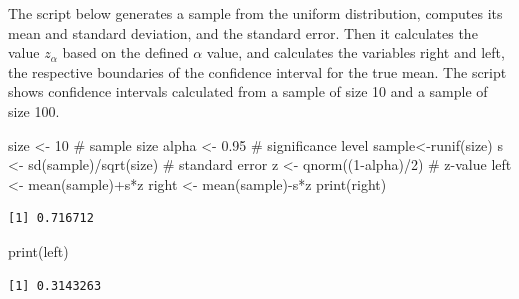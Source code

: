 \documentclass[
  letterpaper,
  DIV=11,
  numbers=noendperiod]{scrreprt}
\newenvironment{Shaded}{\begin{snugshade}}{\end{snugshade}}
\newcommand{\CommentTok}[1]{\textcolor[rgb]{0.37,0.37,0.37}{#1}}
\newcommand{\DecValTok}[1]{\textcolor[rgb]{0.68,0.00,0.00}{#1}}
\newcommand{\FloatTok}[1]{\textcolor[rgb]{0.68,0.00,0.00}{#1}}
\newcommand{\FunctionTok}[1]{\textcolor[rgb]{0.28,0.35,0.67}{#1}}
\newcommand{\NormalTok}[1]{\textcolor[rgb]{0.00,0.23,0.31}{#1}}
\newcommand{\OtherTok}[1]{\textcolor[rgb]{0.00,0.23,0.31}{#1}}
\newcommand{\SpecialCharTok}[1]{\textcolor[rgb]{0.37,0.37,0.37}{#1}}
\begin{document}
The script below generates a sample from the uniform distribution,
computes its mean and standard deviation, and the standard error. Then
it calculates the value \(z_\alpha\) based on the defined \(\alpha\)
value, and calculates the variables right and left, the respective
boundaries of the confidence interval for the true mean. The script
shows confidence intervals calculated from a sample of size 10 and a
sample of size 100.

\begin{Shaded}
\begin{Highlighting}[]
\NormalTok{size }\OtherTok{\textless{}{-}} \DecValTok{10} \CommentTok{\# sample size}
\NormalTok{alpha }\OtherTok{\textless{}{-}} \FloatTok{0.95} \CommentTok{\# significance level}
\NormalTok{sample}\OtherTok{\textless{}{-}}\FunctionTok{runif}\NormalTok{(size)}
\NormalTok{s }\OtherTok{\textless{}{-}} \FunctionTok{sd}\NormalTok{(sample)}\SpecialCharTok{/}\FunctionTok{sqrt}\NormalTok{(size) }\CommentTok{\# standard error}
\NormalTok{z }\OtherTok{\textless{}{-}} \FunctionTok{qnorm}\NormalTok{((}\DecValTok{1}\SpecialCharTok{{-}}\NormalTok{alpha)}\SpecialCharTok{/}\DecValTok{2}\NormalTok{) }\CommentTok{\# z{-}value}
\NormalTok{left }\OtherTok{\textless{}{-}} \FunctionTok{mean}\NormalTok{(sample)}\SpecialCharTok{+}\NormalTok{s}\SpecialCharTok{*}\NormalTok{z}
\NormalTok{right }\OtherTok{\textless{}{-}} \FunctionTok{mean}\NormalTok{(sample)}\SpecialCharTok{{-}}\NormalTok{s}\SpecialCharTok{*}\NormalTok{z}
\FunctionTok{print}\NormalTok{(right)}
\end{Highlighting}
\end{Shaded}

\begin{verbatim}
[1] 0.716712
\end{verbatim}

\begin{Shaded}
\begin{Highlighting}[]
\FunctionTok{print}\NormalTok{(left)}
\end{Highlighting}
\end{Shaded}

\begin{verbatim}
[1] 0.3143263
\end{verbatim}
\end{document}
